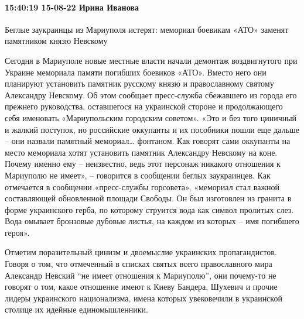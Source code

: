  
 
 
 
 

\paragraph{15:40:19 15-08-22 Ирина Иванова}

Беглые заукраинцы из Мариуполя истерят: мемориал боевикам «АТО» заменят
памятником князю Невскому

Сегодня в Мариуполе новые местные власти начали демонтаж воздвигнутого при
Украине мемориала памяти погибших боевиков «АТО». Вместо него они планируют
установить памятник русскому князю и православному святому Александру
Невскому.Об этом сообщает пресс-служба сбежавшего из города его прежнего
руководства, оставшегося на украинской стороне и продолжающего себя именовать
«Мариупольским городским советом». «Это и без того циничный и жалкий поступок,
но российские оккупанты и их пособники пошли еще дальше – они назвали памятный
мемориал… фонтаном. Как говорят сами оккупанты на место мемориала хотят
установить памятник Александру Невскому на коне. Почему именно ему –
неизвестно, ведь этот персонаж никакого отношения к Мариуполю не имеет», –
говорится в сообщении беглых заукраинцев. Как отмечается в сообщении
«пресс-службы горсовета», «мемориал стал важной составляющей обновленной
площади Свободы. Он был изготовлен из гранита в форме украинского герба, по
которому струится вода как символ пролитых слез. Вода омывает бронзовые дубовые
листья, на каждом из которых – имя погибшего героя». 

Отметим поразительный цинизм и двоемыслие украинских пропагандистов. Говоря о
том, что отмеченный в списках святых всего православного мира Александр Невский
“не имеет отношения к Мариуполю”, они почему-то не говорят о том, какое
отношение имеют к Киеву Бандера, Шухевич и прочие лидеры украинского
национализма, имена которых увековечили в украинской столице их идейные
единомышленники. 
